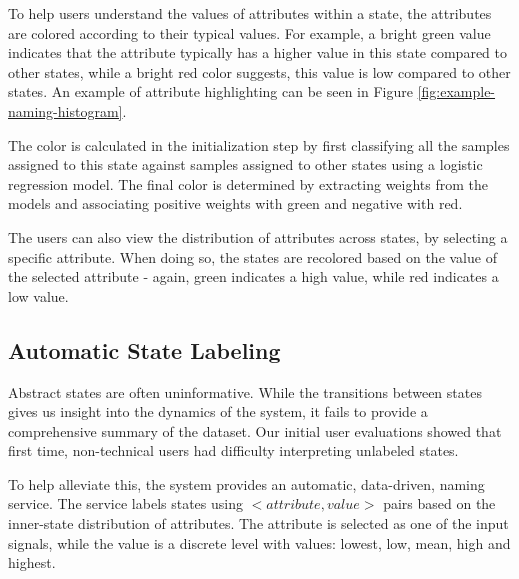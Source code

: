 %
To help users understand the  values of attributes within a state, the attributes are colored according to their typical values.  For example, a bright green
value indicates that the attribute typically  has a higher value in this state compared to other states, while
a bright red color suggests, this value is low compared to other states. An example of attribute 
highlighting can be seen in Figure \ref{fig:example-naming-histogram}.

The color is calculated in the initialization step by first classifying all the samples assigned to this state 
against samples assigned to other states using a logistic regression model. 
The final color is determined by extracting weights from the models and associating positive weights
with green and negative with red.

The users can also view the distribution of attributes across states, by selecting a specific attribute.
When doing so, the states are recolored based on the value of the selected attribute - again, green indicates
a high value, while red indicates a low value.


\subsection{Automatic State Labeling}

Abstract states are often uninformative. While the transitions between states gives us insight into the dynamics of the system, it fails to provide a comprehensive summary 
of the dataset. Our initial user evaluations showed that first time, non-technical users had difficulty interpreting unlabeled states. %

To help alleviate this, the system provides an automatic, data-driven, naming service. The service labels states using $<attribute,value>$ pairs based on the inner-state distribution of attributes. The attribute is selected as one of the input signals, while the value is a discrete level with values: lowest, low, mean, high and highest.  

